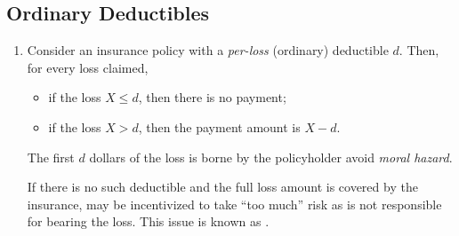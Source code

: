 \subsection{Ordinary Deductibles}
\begin{enumerate}
\item Consider an insurance policy with a \emph{per-loss} (ordinary) deductible
\(d\). Then, for every loss claimed,
\begin{itemize}
\item if the loss \(X\le d\), then there is no payment;
\item if the loss \(X>d\), then the payment amount is \(X-d\).
\end{itemize}
The first \(d\) dollars of the loss  is borne by the
policyholder   avoid \emph{moral hazard}.

\begin{note}
If there is no such deductible and the full loss amount is covered by the
insurance,  may be incentivized to take ``too much'' risk as
 is not responsible for bearing the loss. This issue is known as
.
\end{note}


\end{enumerate}
